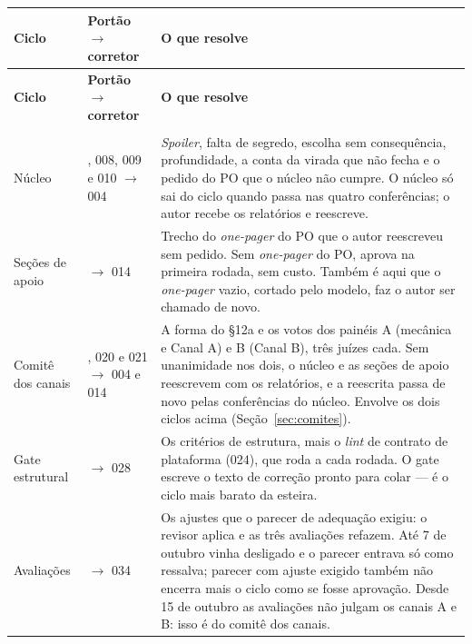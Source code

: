 \documentclass[11pt,a4paper]{article}
\begin{document}
\begin{center}
\begin{longtable}{>{\raggedright\arraybackslash}p{2.3cm}>{\raggedright\arraybackslash}p{4.0cm}p{8.3cm}}
\toprule
\sffamily\bfseries\footnotesize\color{unNavy}Ciclo & \sffamily\bfseries\footnotesize\color{unNavy}Portão $\rightarrow$ corretor & \sffamily\bfseries\footnotesize\color{unNavy}O que resolve \\
\midrule
\endfirsthead
\toprule
\sffamily\bfseries\footnotesize\color{unNavy}Ciclo & \sffamily\bfseries\footnotesize\color{unNavy}Portão $\rightarrow$ corretor & \sffamily\bfseries\footnotesize\color{unNavy}O que resolve \\
\midrule
\endhead
\multicolumn{3}{@{}l}{\sffamily\bfseries\scriptsize\color{unLavanda}PRODUTO} \\[2pt]
Núcleo & 007, 008, 009 e 010 $\rightarrow$ 004 & \emph{Spoiler}, falta de segredo, escolha sem consequência, profundidade, a conta da virada que não fecha e o pedido do PO que o núcleo não cumpre. O núcleo só sai do ciclo quando passa nas quatro conferências; o autor recebe os relatórios e reescreve. \\
\addlinespace
Seções de apoio & 015 $\rightarrow$ 014 & Trecho do \emph{one-pager} do PO que o autor reescreveu sem pedido. Sem \emph{one-pager} do PO, aprova na primeira rodada, sem custo. Também é aqui que o \emph{one-pager} vazio, cortado pelo modelo, faz o autor ser chamado de novo. \\
\addlinespace
Comitê dos canais & 018, 020 e 021 $\rightarrow$ 004 e 014 & A forma do \S12a e os votos dos painéis A (mecânica e Canal A) e B (Canal B), três juízes cada. Sem unanimidade nos dois, o núcleo e as seções de apoio reescrevem com os relatórios, e a reescrita passa de novo pelas conferências do núcleo. Envolve os dois ciclos acima (Seção~\ref{sec:comites}). \\
\addlinespace
Gate estrutural & 026 $\rightarrow$ 028 & Os critérios de estrutura, mais o \emph{lint} de contrato de plataforma (024), que roda a cada rodada. O gate escreve o texto de correção pronto para colar --- é o ciclo mais barato da esteira. \\
\addlinespace
Avaliações & 033 $\rightarrow$ 034 & Os ajustes que o parecer de adequação exigiu: o revisor aplica e as três avaliações refazem. Até 7 de outubro vinha desligado e o parecer entrava só como ressalva; parecer com ajuste exigido também não encerra mais o ciclo como se fosse aprovação. Desde 15 de outubro as avaliações não julgam os canais A e B: isso é do comitê dos canais. \\

\end{longtable}
\end{center}
\end{document}
